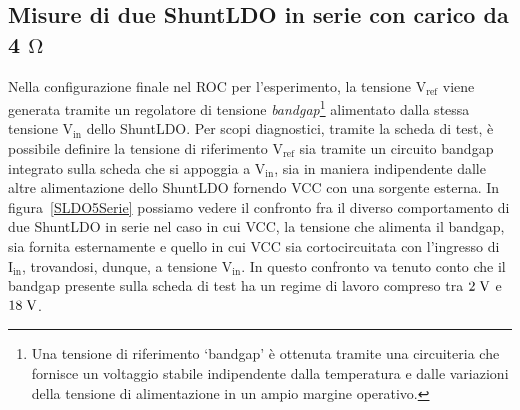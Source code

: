 \subsection{Misure di due ShuntLDO in serie con carico da 4 $\mathrm{\Omega}$}

Nella configurazione finale nel ROC per l'esperimento, la tensione $\mathrm{V_{ref}}$ viene generata tramite un regolatore di tensione {\em bandgap}\footnote{Una tensione di riferimento `bandgap' \`e ottenuta tramite una circuiteria che fornisce un voltaggio stabile indipendente dalla temperatura e dalle variazioni della tensione di alimentazione in un ampio margine operativo.} alimentato dalla stessa tensione $\mathrm{V_{in}}$ dello ShuntLDO. 
Per scopi diagnostici, tramite la scheda di test, \`e possibile definire la tensione di riferimento $\mathrm{V_{ref}}$ sia tramite un circuito bandgap integrato sulla scheda che si appoggia a $\mathrm{V_{in}}$, sia in maniera indipendente dalle altre alimentazione dello ShuntLDO fornendo VCC con una sorgente esterna. 
In figura~\ref{SLDO5Serie} possiamo vedere il confronto fra il diverso comportamento di due ShuntLDO in serie nel caso in cui VCC, la tensione che alimenta il bandgap, sia fornita esternamente e quello in cui VCC sia cortocircuitata con l'ingresso di $\mathrm{I_{in}}$, trovandosi, dunque, a tensione $\mathrm{V_{in}}$.
In questo confronto va tenuto conto che il bandgap presente sulla scheda di test ha un regime di lavoro compreso tra $2\rm \; V$ e $18\rm \; V$. 
